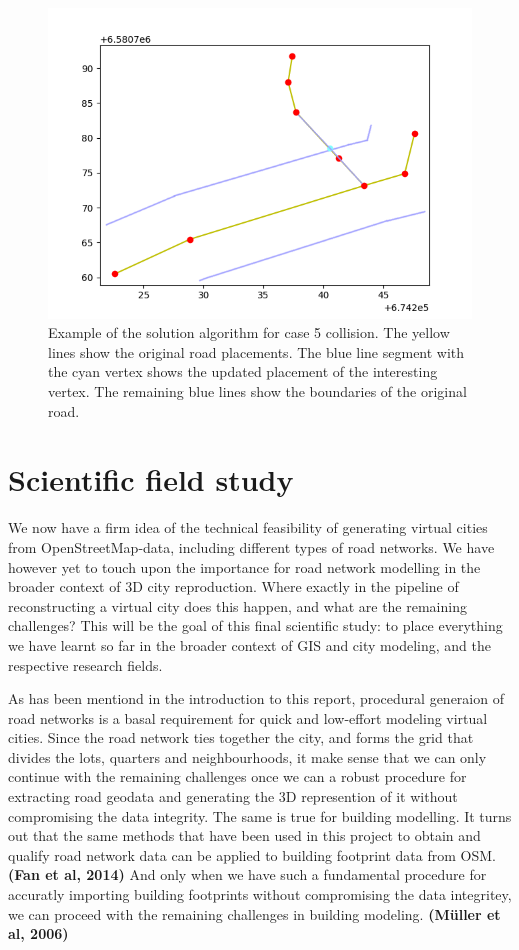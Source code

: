 \documentclass{kththesis}
\begin{document}
\begin{figure}[H]
    \centering
    \includegraphics[width=\textwidth,height=0.5\textheight,keepaspectratio]{img_feature_overlap_fix_4}
    \caption{Example of the solution algorithm for case 5 collision. The yellow lines show the original road placements. The blue line segment with the cyan vertex shows the updated placement of the interesting vertex. The remaining blue lines show the boundaries of the original road.}
    \label{fig:collision-case-5}
\end{figure}

\section{Scientific field study}

We now have a firm idea of the technical feasibility of generating virtual cities from OpenStreetMap-data, including different types of road networks.
We have however yet to touch upon the importance for road network modelling in the broader context of 3D city reproduction.
Where exactly in the pipeline of reconstructing a virtual city does this happen, and what are the remaining challenges?
This will be the goal of this final scientific study: to place everything we have learnt so far in the broader context of GIS and city modeling, and the respective research fields.

As has been mentiond in the introduction to this report, procedural generaion of road networks is a basal requirement for quick and low-effort modeling virtual cities.
Since the road network ties together the city, and forms the grid that divides the lots, quarters and neighbourhoods, it make sense that we can only continue with the remaining challenges once we can a robust procedure for extracting road geodata and generating the 3D represention of it without compromising the data integrity. 
The same is true for building modelling.
It turns out that the same methods that have been used in this project to obtain and qualify road network data can be applied to building footprint data from OSM. \textbf{(Fan et al, 2014)}
And only when we have such a fundamental procedure for accuratly importing building footprints without compromising the data integritey, we can proceed with the remaining challenges in building modeling. \textbf{(Müller et al, 2006)}
\end{document}
